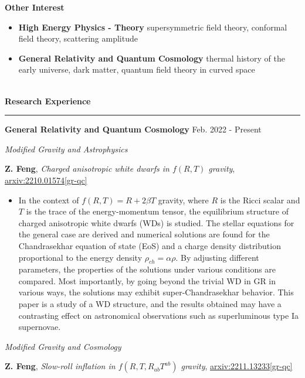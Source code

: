 \documentclass[12pt]{article}
\renewcommand*{\section}[1]{
    ~\\ \noindent \textbf{#1} \medskip \hrule \medskip
}
\begin{document}
\textbf{Other Interest}
\begin{itemize}[noitemsep,nolistsep]
    \item \textbf{High Energy Physics - Theory} supersymmetric field theory, conformal field theory, scattering amplitude
    \item \textbf{General Relativity and Quantum Cosmology} thermal history of the early universe, dark matter, quantum field theory in curved space
\end{itemize}


\section{Research Experience}

\textbf{General Relativity and Quantum Cosmology} \hfill Feb. 2022 - Present

\smallskip \quad \textit{Modified Gravity and Astrophysics}

\textbf{Z. Feng}, \textit{Charged anisotropic white dwarfs in $f\left({R}, {T}\right)$ gravity}, \href{https://arxiv.org/abs/2210.01574}{arxiv:2210.01574[gr-qc]}

\begin{itemize}[noitemsep,nolistsep]
    \item In the context of $f(R, T) = R + 2 \beta T$ gravity, where $R$ is the Ricci scalar and $T$ is the trace of the energy-momentum tensor, the equilibrium structure of charged anisotropic white dwarfs (WDs) is studied. The stellar equations for the general case are derived and numerical solutions are found for the Chandrasekhar equation of state (EoS) and a charge density distribution proportional to the energy density $\rho_{ch} = \alpha \rho$. By adjusting different parameters, the properties of the solutions under various conditions are compared. Most importantly, by going beyond the trivial WD in GR in various ways, the solutions may exhibit super-Chandrasekhar behavior. This paper is a study of a WD structure, and the results obtained may have a contrasting effect on astronomical observations such as superluminous type Ia supernovae.
\end{itemize}

\smallskip \quad \textit{Modified Gravity and Cosmology}

\textbf{Z. Feng}, \textit{Slow-roll inflation in $f\left(R, T, R_{ab}T^{ab}\right)$ gravity}, \href{https://arxiv.org/abs/2211.13233}{arxiv:2211.13233[gr-qc]}
\end{document}

